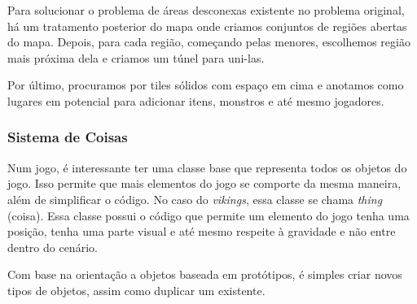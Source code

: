       Para solucionar o problema de áreas desconexas existente no problema original, há um tratamento posterior
      do mapa onde criamos conjuntos de regiões abertas do mapa. Depois, para cada região, começando pelas menores,
      escolhemos região mais próxima dela e criamos um túnel para uni-las.
      
      Por último, procuramos por tiles sólidos com espaço em cima e anotamos como lugares em potencial para adicionar
      itens, monstros e até mesmo jogadores.
      
    \subsubsection{Sistema de Coisas}
      Num jogo, é interessante ter uma classe base que representa todos os objetos do jogo. Isso permite
      que mais elementos do jogo se comporte da mesma maneira, além de simplificar o código. No caso do
      \textit{vikings}, essa classe se chama \textit{thing} (coisa). Essa classe possui o código que permite
      um elemento do jogo tenha uma posição, tenha uma parte visual e até mesmo respeite à gravidade e não entre
      dentro do cenário.
      
      Com base na orientação a objetos baseada em protótipos, é simples criar novos tipos de objetos, assim
      como duplicar um existente.
    
    
      
